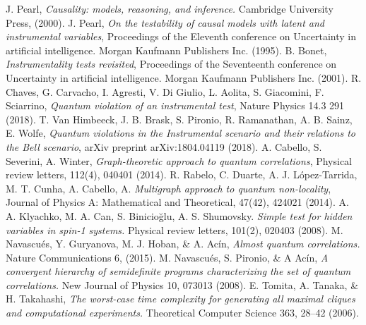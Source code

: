 \documentclass[letterpaper]{article}
\begin{document}
\begin{thebibliography}{}
     J. Pearl, 
        {\em Causality: models, reasoning, and inference.}
        Cambridge University Press, (2000).
     J. Pearl, 
        {\em On the testability of causal models with latent and instrumental variables}, 
        Proceedings of the Eleventh conference on Uncertainty in artificial
        intelligence. Morgan Kaufmann Publishers Inc. (1995).
     B. Bonet, {\em Instrumentality tests revisited},
        Proceedings of the Seventeenth conference on Uncertainty in artificial
        intelligence. Morgan Kaufmann Publishers Inc. (2001).
     R. Chaves, G. Carvacho, I. Agresti, V. Di Giulio, L. Aolita,
        S. Giacomini, F. Sciarrino, 
        {\em Quantum violation of an instrumental test}, 
        Nature Physics 14.3 291 (2018).
      T. Van Himbeeck, J. B. Brask, S. Pironio, R. Ramanathan, A. B. Sainz, E. Wolfe, 
        {\em Quantum violations in the Instrumental scenario and their relations to the Bell scenario},
        arXiv preprint arXiv:1804.04119 (2018).
      A. Cabello, S. Severini, A. Winter,
         {\em Graph-theoretic approach to quantum correlations}, 
         Physical review letters, 112(4), 040401 (2014).
      R. Rabelo, C. Duarte, A. J.  López-Tarrida, M. T. Cunha, A. Cabello, A. 
         {\em Multigraph approach to quantum non-locality},
         Journal of Physics A: Mathematical and Theoretical, 47(42), 424021
         (2014).
      A. A. Klyachko, M. A. Can, S. Binicioğlu, A. S. Shumovsky.
         {\em Simple test for hidden variables in spin-1 systems.}
         Physical review letters, 101(2), 020403 (2008).
      M. Navascués, Y. Guryanova, M. J. Hoban, \& A. Acín, 
         {\em Almost quantum correlations.}
         Nature Communications 6, (2015).
      M. Navascués, S. Pironio, \& A Acín, 
         {\em A convergent hierarchy of semidefinite programs characterizing the
         set of quantum correlations.}
         New Journal of Physics 10, 073013 (2008).
      E. Tomita, A. Tanaka, \& H. Takahashi,
         {\em The worst-case time complexity for generating all maximal cliques
         and computational experiments.} 
         Theoretical Computer Science 363, 28–42 (2006).
\end{thebibliography}

\end{document}
